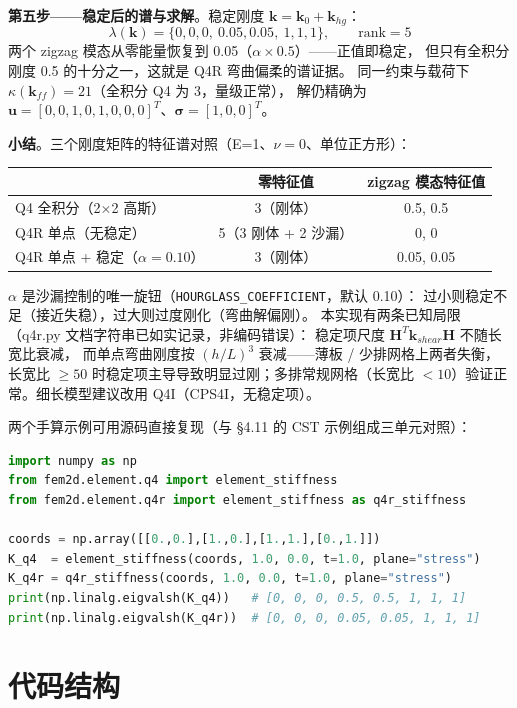 \documentclass[12pt,a4paper]{ctexart}
\newcommand{\fem}{\Verb}
\begin{document}
\textbf{第五步——稳定后的谱与求解}。稳定刚度 $\mathbf{k} = \mathbf{k}_0 + \mathbf{k}_{hg}$：
\begin{equation}
\lambda(\mathbf{k}) = \{0, 0, 0,\ 0.05, 0.05,\ 1, 1, 1\},\qquad \mathrm{rank} = 5
\end{equation}
两个 zigzag 模态从零能量恢复到 0.05（$\alpha \times 0.5$）——正值即稳定，
但只有全积分刚度 0.5 的十分之一，这就是 Q4R 弯曲偏柔的谱证据。
同一约束与载荷下 $\kappa(\mathbf{k}_{ff}) = 21$（全积分 Q4 为 3，量级正常），
解仍精确为 $\mathbf{u} = [0,0,1,0,1,0,0,0]^T$、$\boldsymbol{\sigma} = [1,0,0]^T$。

\textbf{小结}。三个刚度矩阵的特征谱对照（E=1、$\nu=0$、单位正方形）：
\begin{center}\small
\begin{tabular}{lcc}
& 零特征值 & zigzag 模态特征值 \\ \hline
Q4 全积分（2$\times$2 高斯） & 3（刚体） & 0.5, 0.5 \\
Q4R 单点（无稳定） & 5（3 刚体 + 2 沙漏） & 0, 0 \\
Q4R 单点 + 稳定（$\alpha=0.10$） & 3（刚体） & 0.05, 0.05 \\
\end{tabular}
\end{center}
$\alpha$ 是沙漏控制的唯一旋钮（\fem|HOURGLASS_COEFFICIENT|，默认 0.10）：
过小则稳定不足（接近失稳），过大则过度刚化（弯曲解偏刚）。
本实现有两条已知局限（q4r.py 文档字符串已如实记录，非编码错误）：
稳定项尺度 $\mathbf{H}^T\mathbf{k}_{shear}\mathbf{H}$ 不随长宽比衰减，
而单点弯曲刚度按 $(h/L)^3$ 衰减——薄板 / 少排网格上两者失衡，
长宽比 $\ge 50$ 时稳定项主导导致明显过刚；多排常规网格（长宽比
$< 10$）验证正常。细长模型建议改用 Q4I（CPS4I，无稳定项）。

两个手算示例可用源码直接复现（与 §4.11 的 CST 示例组成三单元对照）：
\begin{lstlisting}[language=python]
import numpy as np
from fem2d.element.q4 import element_stiffness
from fem2d.element.q4r import element_stiffness as q4r_stiffness

coords = np.array([[0.,0.],[1.,0.],[1.,1.],[0.,1.]])
K_q4  = element_stiffness(coords, 1.0, 0.0, t=1.0, plane="stress")
K_q4r = q4r_stiffness(coords, 1.0, 0.0, t=1.0, plane="stress")
print(np.linalg.eigvalsh(K_q4))   # [0, 0, 0, 0.5, 0.5, 1, 1, 1]
print(np.linalg.eigvalsh(K_q4r))  # [0, 0, 0, 0.05, 0.05, 1, 1, 1]
\end{lstlisting}

\section{代码结构}
\end{document}
